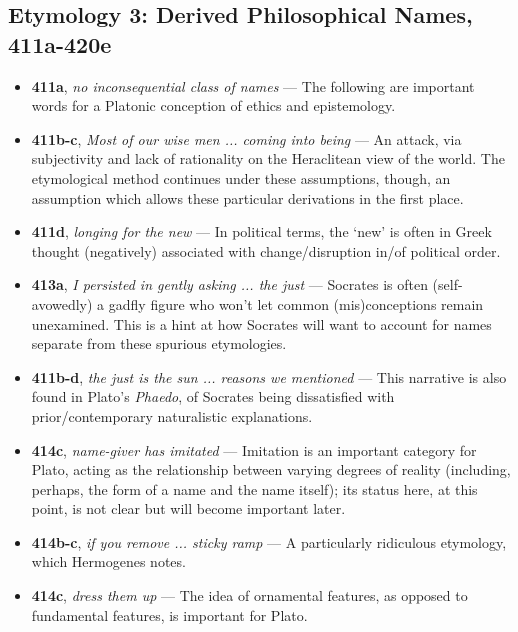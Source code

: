 \documentclass[12pt]{article}
\begin{document}
\subsection{Etymology 3: Derived Philosophical Names, 411a-420e}

\begin{itemize}

\item \textbf{411a}, \textit{no inconsequential class of names} --- The following are important words for a Platonic conception of ethics and epistemology.

\item \textbf{411b-c}, \textit{Most of our wise men ... coming into being} --- An attack, via subjectivity and lack of rationality on the Heraclitean view of the world. The etymological method continues under these assumptions, though, an assumption which allows these particular derivations in the first place.

\item \textbf{411d}, \textit{longing for the new} --- In political terms, the `new' is often in Greek thought (negatively) associated with change/disruption in/of political order.

\item \textbf{413a}, \textit{I persisted in gently asking ... the just} --- Socrates is often (self-avowedly) a gadfly figure who won't let common (mis)conceptions remain unexamined. This is a hint at how Socrates will want to account for names separate from these spurious etymologies.

\item \textbf{411b-d}, \textit{the just is the sun ... reasons we mentioned} --- This narrative is also found in Plato's \textit{Phaedo}, of Socrates being dissatisfied with prior/contemporary naturalistic explanations.

\item \textbf{414c}, \textit{name-giver has imitated} --- Imitation is an important category for Plato, acting as the relationship between varying degrees of reality (including, perhaps, the form of a name and the name itself); its status here, at this point, is not clear but will become important later. 

\item \textbf{414b-c}, \textit{if you remove ... sticky ramp} --- A particularly ridiculous etymology, which Hermogenes notes.

\item \textbf{414c}, \textit{dress them up} --- The idea of ornamental features, as opposed to fundamental features, is important for Plato.


\end{itemize}
\end{document}
